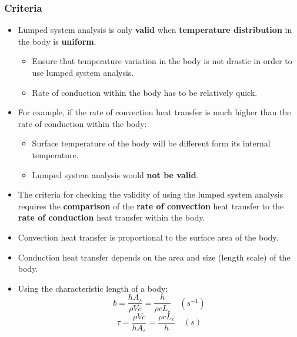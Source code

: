 \documentclass[11pt]{article}
\begin{document}
 \newpage

\subsubsection{Criteria}
\label{sec:org4376b0f}
\begin{itemize}
\item Lumped system analysis is only \textbf{valid} when \textbf{temperature distribution} in the body is \textbf{uniform}.
\begin{itemize}
\item Ensure that temperature variation in the body is not drastic in order to use lumped system analysis.
\item Rate of conduction within the body has to be relatively quick.
\end{itemize}
\item For example, if the rate of convection heat transfer is much higher than the rate of conduction within the body:
\begin{itemize}
\item Surface temperature of the body will be different form its internal temperature.
\item Lumped system analysis would \textbf{not be valid}.
\end{itemize}
\item The criteria for checking the validity of using the lumped system analysis requires the \textbf{comparison} of the \textbf{rate of convection} heat transfer to the \textbf{rate of conduction} heat transfer within the body.
\item Convection heat transfer is proportional to the surface area of the body.
\item Conduction heat transfer depends on the area and size (length scale) of the body.
\item Using the characteristic length of a body:
\[b = \frac{h A_s}{\rho V c} = \frac{h}{\rho c L_c} \quad (\unit{s^{-1}})\]
\[\tau = \frac{\rho V c}{h A_s} = \frac{\rho c L_c}{h} \quad (\unit{s})\]
\end{itemize}

 \newpage
\end{document}
